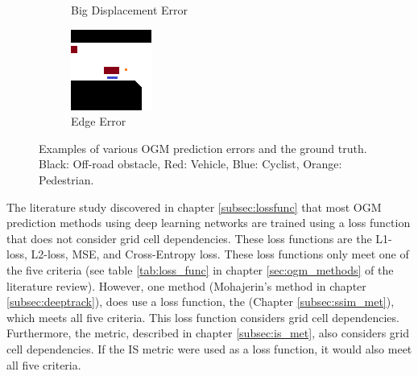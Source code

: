 \begin{figure}[h]
\begin{subfigure}[t]{0.25\linewidth}
		\caption{Big Displacement Error}
		\label{fig:met_crit_bdisp}
	\end{subfigure} \hfil
	\begin{subfigure}[t]{0.25\linewidth}
		\includegraphics[width=\linewidth]{Figures/Res_Prop/Edge_colloquium}
		\caption{Edge Error}
		\label{fig:met_crit_edge}
	\end{subfigure} \hfil
	\caption{Examples of various \gls{OGM} prediction errors and the ground truth. Black: Off-road obstacle, Red: Vehicle, Blue: Cyclist, Orange: Pedestrian.}
	\label{fig:met_crit}
\end{figure}


The literature study discovered in chapter \ref{subsec:lossfunc} that most \gls{OGM} prediction methods using deep learning networks are trained using a loss function that does not consider grid cell dependencies. These loss functions are the L1-loss, L2-loss, \gls{MSE}, and Cross-Entropy loss. These loss functions only meet one of the five criteria (see table \ref{tab:loss_func} in chapter \ref{sec:ogm_methods} of the literature review). However, one method (Mohajerin's \cite{mohajerin2019multi} method in chapter \ref{subsec:deeptrack}), does use a loss function, the  (Chapter \ref{subsec:ssim_met}), which meets all five criteria. This loss function considers grid cell dependencies. Furthermore, the  metric, described in chapter \ref{subsec:is_met}, also considers grid cell dependencies. If the \gls{IS} metric were used as a loss function, it would also meet all five criteria. \\

